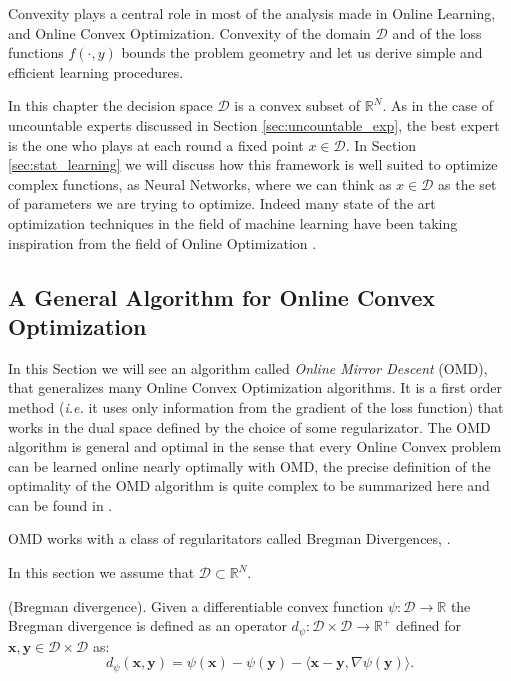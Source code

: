 Convexity plays a central role in most of the analysis made in Online Learning, and Online Convex Optimization. Convexity of the domain $\mathcal D$ and of the loss functions $f(\cdot,y)$ bounds the problem geometry and let us derive simple and efficient learning procedures.

In this chapter the decision space $\mathcal D$ is a convex subset of $\mathbb R^N$. As in the case of uncountable experts discussed in Section \ref{sec:uncountable_exp}, the best expert is the one who plays at each round a fixed point $x\in\mathcal D$. In Section \ref{sec:stat_learning} we will discuss how this framework is well suited to optimize complex functions, as Neural Networks, where we can think as $x\in\mathcal D$ as the set of parameters we are trying to optimize. Indeed many state of the art optimization techniques in the field of machine learning have been taking inspiration from the field of Online Optimization \cite{duchi2011adaptive}.

\subsection{A General Algorithm for Online Convex Optimization}\label{sec:OMD}

In this Section we will see an algorithm called \emph{Online Mirror Descent} (OMD), that generalizes many Online Convex Optimization algorithms. It is a first order method (\emph{i.e.} it uses only information from the gradient of the loss function) that works in the dual space defined by the choice of some regularizator. The OMD algorithm is general and optimal in the sense that every Online Convex problem can be learned online nearly optimally with OMD, the precise definition of the optimality of the OMD algorithm is quite complex to be summarized here and can be found in \cite{srebro2011universality}.

OMD works with a class of regularitators called Bregman Divergences, \cite{banerjee2005clustering}.

In this section we assume that $\mathcal D\subset \mathbb R^N$.

\begin{definition}(Bregman divergence). Given a differentiable convex function $\psi:\mathcal D\to\mathbb R$ the Bregman divergence is defined as an operator $d_{\psi}:\mathcal D\times\mathcal D\to \mathbb R^+$ defined for $\mathbf x,\mathbf y\in\mathcal D\times\mathcal D$ as: 
\begin{equation}\label{eq:bregman_div}
d_\psi(\mathbf x,\mathbf y)=\psi(\mathbf x)-\psi(\mathbf y)-\langle \mathbf x-\mathbf y,\nabla \psi(\mathbf y)\rangle.
\end{equation}
\end{definition}

